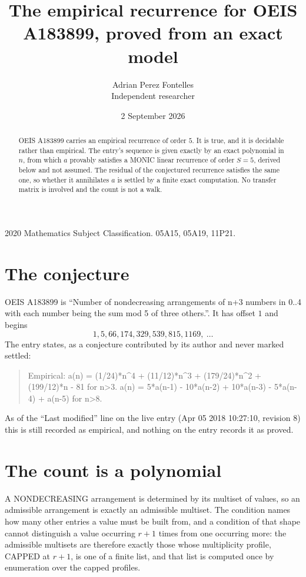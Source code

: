 \documentclass[11pt,a4paper]{article}
\title{The empirical recurrence for OEIS A183899, proved from an exact model}
\author{Adrian Perez Fontelles\\ \small Independent researcher}
\date{2 September 2026}
\theoremstyle{plain}
\theoremstyle{definition}
\begin{document}
\maketitle

\begin{abstract}
OEIS A183899 carries an empirical recurrence of order $5$. It is true, and it is
decidable rather than empirical. The entry's sequence is given exactly by an exact polynomial in $n$, from
which $a$ provably satisfies a MONIC linear recurrence of order $S=5$, derived below and not
assumed. The residual of the conjectured recurrence satisfies the same one, so whether it
annihilates $a$ is settled by a finite exact computation. No transfer matrix is involved and
the count is not a walk.
\end{abstract}

\noindent\small 2020 Mathematics Subject Classification. 05A15, 05A19, 11P21.\normalsize

\section{The conjecture}

OEIS A183899 is ``Number of nondecreasing arrangements of n+3 numbers in 0..4 with each number being the sum mod 5 of three others.''. It has offset $1$ and begins
\[
1, 5, 66, 174, 329, 539, 815, 1169,\ \dots
\]
The entry states, as a conjecture contributed by its author and never marked settled:
\begin{quote}
Empirical: a(n) = (1/24)*n\^{}4 + (11/12)*n\^{}3 + (179/24)*n\^{}2 + (199/12)*n - 81 for n>3. a(n) = 5*a(n-1) - 10*a(n-2) + 10*a(n-3) - 5*a(n-4) + a(n-5) for n>8.
\end{quote}
As of the ``Last modified'' line on the live entry (Apr 05 2018 10:27:10, revision 8)
this is still recorded as empirical, and nothing on the entry records it as proved.

\section{The count is a polynomial}

A NONDECREASING arrangement is determined by its multiset of values, so an admissible
arrangement is exactly an admissible multiset. The condition names how many other entries a
value must be built from, and a condition of that shape cannot distinguish a value occurring
$r+1$ times from one occurring more: the admissible multisets are therefore exactly those
whose multiplicity profile, CAPPED at $r+1$, is one of a finite list, and that list is computed
once by enumeration over the capped profiles.
\end{document}
